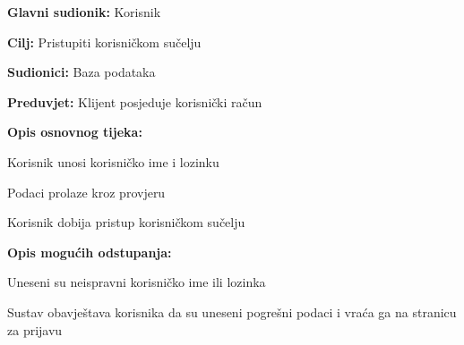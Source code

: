 				\noindent {}
				\begin{packed_item}
					
					\item \textbf{Glavni sudionik: }Korisnik
					\item  \textbf{Cilj:} Pristupiti korisničkom sučelju
					\item  \textbf{Sudionici:} Baza podataka
					\item  \textbf{Preduvjet:} Klijent posjeduje korisnički račun
					\item  \textbf{Opis osnovnog tijeka:}
					
					\item[] \begin{packed_enum}
						
						\item Korisnik unosi korisničko ime i lozinku
						\item Podaci prolaze kroz provjeru
						\item Korisnik dobija pristup korisničkom sučelju
					\end{packed_enum}
					
					\item  \textbf{Opis mogućih odstupanja:}
					
					\item[] \begin{packed_item}
						
						\item[2.a] Uneseni su neispravni korisničko ime ili lozinka 
						\item[] \begin{packed_enum}
							
							\item Sustav obavještava korisnika da su uneseni pogrešni podaci i vraća ga na stranicu za prijavu			
						\end{packed_enum}			
					\end{packed_item}
				\end{packed_item}
			
